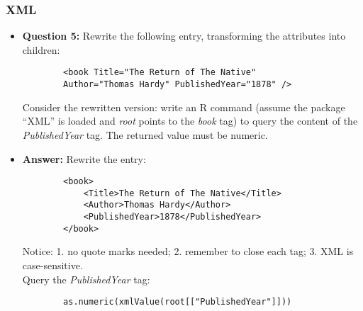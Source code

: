 \documentclass[9pt]{beamer}
\begin{document}
\begin{frame}[fragile]
	\frametitle{XML}
	\begin{itemize}
		\item {\bf Question 5:} Rewrite the following entry, transforming the attributes into children:
		\begin{verbatim}
		<book Title="The Return of The Native" 
		Author="Thomas Hardy" PublishedYear="1878" />
		\end{verbatim}
		Consider the rewritten version: write an R command (assume the package ``XML'' is loaded and \emph{root} points to the \emph{book} tag) to query the content of the \emph{PublishedYear} tag. The returned value must be numeric.
		\item {\bf Answer:} Rewrite the entry:
		\begin{verbatim}
		<book>
			<Title>The Return of The Native</Title>
			<Author>Thomas Hardy</Author>
			<PublishedYear>1878</PublishedYear>
		</book>
		\end{verbatim}
		Notice: 1. no quote marks needed; 2. remember to close each tag; 3. XML is case-sensitive.\\\bigskip
		Query the \emph{PublishedYear} tag:
		\begin{verbatim}
		as.numeric(xmlValue(root[["PublishedYear"]]))
		\end{verbatim}
	\end{itemize}
\end{frame}
\end{document}
